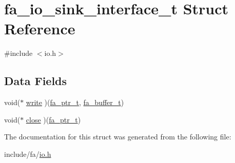 \hypertarget{structfa__io__sink__interface__t}{\section{fa\-\_\-io\-\_\-sink\-\_\-interface\-\_\-t Struct Reference}
\label{structfa__io__sink__interface__t}
}


{\ttfamily \#include $<$io.\-h$>$}

\subsection*{Data Fields}
\begin{DoxyCompactItemize}
\item 
void($\ast$ \hyperlink{group___fa_ga77a9624f994de34bf0aa650082f74cf7}{write} )(\hyperlink{group___fa_ga915ddeae99ad7568b273d2b876425197}{fa\-\_\-ptr\-\_\-t}, \hyperlink{group___fa_buffer_ga0ed7a1d783ab322e2e8be02432d0839e}{fa\-\_\-buffer\-\_\-t})
\item 
void($\ast$ \hyperlink{group___fa_ga49577dffb717ab08d30167c5620e2d03}{close} )(\hyperlink{group___fa_ga915ddeae99ad7568b273d2b876425197}{fa\-\_\-ptr\-\_\-t})
\end{DoxyCompactItemize}


The documentation for this struct was generated from the following file\-:\begin{DoxyCompactItemize}
\item 
include/fa/\hyperlink{io_8h}{io.\-h}\end{DoxyCompactItemize}
